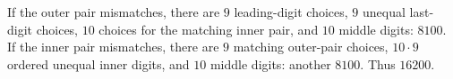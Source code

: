 If the outer pair mismatches, there are $9$ leading-digit choices, $9$ unequal last-digit choices, $10$ choices for the matching inner pair, and $10$ middle digits: $8100$. If the inner pair mismatches, there are $9$ matching outer-pair choices, $10\cdot9$ ordered unequal inner digits, and $10$ middle digits: another $8100$. Thus $\boxed{16200}$.
